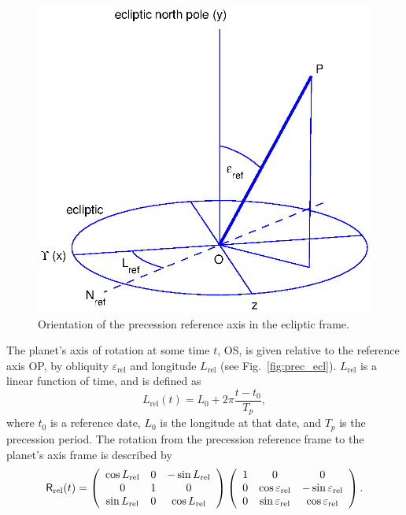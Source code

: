 \documentclass[a4paper]{article}
\newcommand{\mat}[1]{\ensuremath \mathsf{#1}}
\begin{document}
\begin{figure}[ht]
\includegraphics[width=\textwidth]{fig1.eps}
\caption{Orientation of the precession reference axis in the ecliptic frame.}
\label{fig:prec_ref}
\end{figure}
The planet's axis of rotation at some time $t$, OS, is given relative to the reference axis OP, by obliquity $\varepsilon_\mathrm{rel}$ and longitude $L_\mathrm{rel}$ (see Fig.~\ref{fig:prec_ecl}). $L_\mathrm{rel}$ is a linear function of time, and is defined as
\begin{equation}
L_\mathrm{rel}(t) = L_0 + 2\pi \frac{t-t_0}{T_p},
\end{equation}
where $t_0$ is a reference date, $L_0$ is the longitude at that date, and $T_p$ is the precession period.
The rotation from the precession reference frame to the planet's axis frame is described by
\begin{equation}
\mat{R}_\mathrm{rel}(t) = \left(\begin{array}{ccc}
\cos L_\mathrm{rel} & 0 & -\sin L_\mathrm{rel} \\
0 & 1 & 0 \\
\sin L_\mathrm{rel} & 0 & \cos L_\mathrm{rel}
\end{array} \right)
\left(\begin{array}{ccc}
1 & 0 & 0 \\
0 & \cos \varepsilon_\mathrm{rel} & -\sin \varepsilon_\mathrm{rel} \\
0 & \sin \varepsilon_\mathrm{rel} & \cos \varepsilon_\mathrm{rel}
\end{array} \right).
\end{equation}
\end{document}
